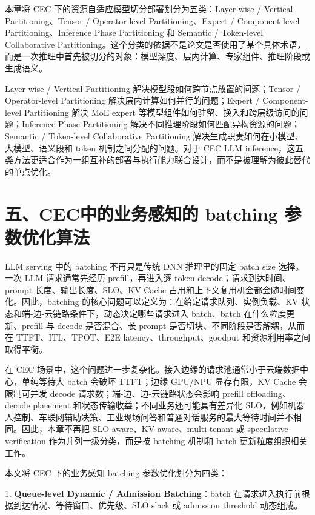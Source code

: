 \documentclass[a4paper,10pt]{ctexart}
\begin{document}
本章将 CEC 下的资源自适应模型切分部署划分为五类：Layer-wise / Vertical Partitioning、Tensor / Operator-level Partitioning、Expert / Component-level Partitioning、Inference Phase Partitioning 和 Semantic / Token-level Collaborative Partitioning。这个分类的依据不是论文是否使用了某个具体术语，而是一次推理中首先被切分的对象：模型深度、层内计算、专家组件、推理阶段或生成语义。


Layer-wise / Vertical Partitioning 解决模型段如何跨节点放置的问题；Tensor / Operator-level Partitioning 解决层内计算如何并行的问题；Expert / Component-level Partitioning 解决 MoE expert 等模型组件如何驻留、换入和跨层级访问的问题；Inference Phase Partitioning 解决不同推理阶段如何匹配异构资源的问题；Semantic / Token-level Collaborative Partitioning 解决生成职责如何在小模型、大模型、语义段和 token 机制之间分配的问题。对于 CEC LLM inference，这五类方法更适合作为一组互补的部署与执行能力联合设计，而不是被理解为彼此替代的单点优化。




\section*{五、CEC中的业务感知的 batching 参数优化算法}

LLM serving 中的 batching 不再只是传统 DNN 推理里的固定 batch size 选择。一次 LLM 请求通常先经历 prefill，再进入逐 token decode；请求到达时间、prompt 长度、输出长度、SLO、KV Cache 占用和上下文复用机会都会随时间变化。因此，batching 的核心问题可以定义为：在给定请求队列、实例负载、KV 状态和端-边-云链路条件下，动态决定哪些请求进入 batch、batch 在什么粒度更新、prefill 与 decode 是否混合、长 prompt 是否切块、不同阶段是否解耦，从而在 TTFT、ITL、TPOT、E2E latency、throughput、goodput 和资源利用率之间取得平衡。


在 CEC 场景中，这个问题进一步复杂化。接入边缘的请求池通常小于云端数据中心，单纯等待大 batch 会破坏 TTFT；边缘 GPU/NPU 显存有限，KV Cache 会限制可并发 decode 请求数；端-边、边-云链路状态会影响 prefill offloading、decode placement 和状态传输收益；不同业务还可能具有差异化 SLO，例如机器人控制、车联网辅助决策、工业现场问答和普通对话服务的最大等待时间并不相同。因此，本章不再把 SLO-aware、KV-aware、multi-tenant 或 speculative verification 作为并列一级分类，而是按 batching 机制和 batch 更新粒度组织相关工作。


本文将 CEC 下的业务感知 batching 参数优化划分为四类：


1. \textbf{Queue-level Dynamic / Admission Batching}：batch 在请求进入执行前根据到达情况、等待窗口、优先级、SLO slack 或 admission threshold 动态组成。
\end{document}
